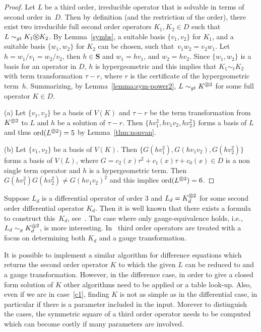 \documentclass{article}
\newcommand{\ord}{\mathrm{ord}}
\newcommand{\cS}{\circledS}
\newcommand{\Seq}{\mathbf{S}}
\begin{document}
\begin{proof} Let $L$ be a third order, irreducible operator that is
    solvable in terms of second order in~$D$.  Then by definition (and the restriction of
    the order), there exist two irreducible full second order operators $K_1, K_2 \in D$
    such that $L\sim_{gt}K_1\cS K_2$. By Lemma~\ref{symbs}, a suitable basis $\{v_1,v_2\}$
    for $K_1$, and a suitable basis $\{w_1,w_2\}$ for $K_2$ can be chosen, such
    that~$v_1w_2=v_2w_1$.  Let $h=w_1/v_1=w_2/v_2$, then $h \in \Seq$ and $w_1=hv_1$, and
    $w_2=hv_2$.  Since $\{ w_1, w_2\}$ is a basis for an operator in $D$, $h$ is
    hypergeometric and this implies that $K_1 \sim_t K_2$ with term transformation
    $\tau-r$, where $r$ is the certificate of the hypergeometric term~$h$. Summarizing, by
    Lemma~\ref{lemma:sym-power2}, $L \sim_{gt} K^{\circledS 2}$ for some full operator $K
    \in D$.

  
  (a) Let $\{ v_1, v_2 \}$ be a basis of $V(K)$ and $\tau-r$ be the term transformation from $K^{\cS 2}$ to $L$ and $h$ be a solution of $\tau-r$. Then
  $\{ hv_1^2, hv_1v_2, hv_2^2 \}$ forms a basis of $L$ and thus $\ord(L^{\circledS 2})=5$ by Lemma~\ref{thm:nonvan}.
  
 


  (b) Let $\{ v_1, v_2 \}$ be a basis of $V(K)$. Then $\{ G(hv_1^2), G(hv_1v_2), G(hv_2^2)
  \}$ forms a basis of $V(L)$, where $G=c_2(x)\tau^2+c_1(x)\tau+c_0(x) \in D$ is a non
  single term operator and $h$ is a hypergeometric term.  Then $G(hv_1^2)G(hv_2^2) \neq
  G(hv_1v_2)^2$ and this implies $\ord(L^{\circledS 2})=6$.
 \end{proof}



 Suppose $L_d$ is a differential operator of order 3 and $L_d = K_d^{\cS 2}$ for some
 second order differential operator $K_d$. Then it is well known that there exists a
 formula to construct this~$K_d$, see~\cite[Lemma 3.4]{MS85}. The case where only
 gauge-equivalence holds, i.e., $L_d\sim_g K_d^{\cS2}$, is more interesting.
 In~\cite{vH07} third order operators are treated with a focus on determining both $K_d$
 and a gauge transformation.


 It is possible to implement a similar algorithm for difference equations which returns
 the second order operator $K$ to which the given $L$ can be reduced to and a gauge
 transformation.  However, in the difference case, in order to give a closed form solution
 of $K$ other algorithms need to be applied or a table look-up. Also, even if we are in
 case~\eqref{c1}, finding $K$ is not as simple as in the differential case, in particular
 if there is a parameter included in the input.  Morever to distinguish the cases, the
 symmetric square of a third order operator needs to be computed which can become costly
 if many parameters are involved.
\end{document}
